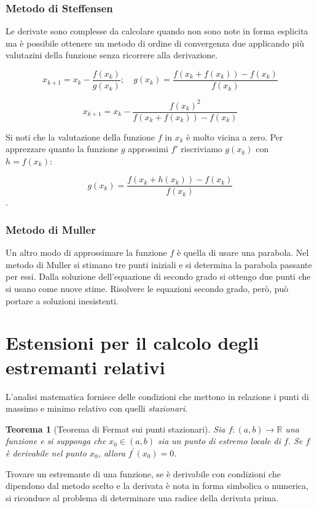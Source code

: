 \documentclass[12pt]{article}
\theoremstyle{plain}%
\newtheorem{thm}{Teorema}[section]
\theoremstyle{definition}
\theoremstyle{remark}
\begin{document}
\subsubsection{Metodo di Steffensen}

Le derivate sono complesse da calcolare quando non sono
note in forma esplicita ma è possibile ottenere un metodo
di ordine di convergenza due applicando più valutazini della funzione
senza ricorrere alla derivazione.

$$x_{k+1} = x_k -\frac{f(x_k)}{g(x_k)};\quad g(x_k) =\frac{f(x_k + f(x_k )) - f(x_k )}{f(x_k)}$$

$$x_{k+1} = x_k - \frac{f(x_k)^2}{f(x_k + f(x_k )) - f(x_k )}$$

Si noti che la valutazione della funzione $f$ in $x_k$ è molto vicina a zero.
Per apprezzare quanto la funzione $g$ approssimi $f'$ riscriviamo $g(x_k)$ con
$h = f(x_k)$:

$$g(x_k) =\frac{f(x_k + h(x_k )) - f(x_k )}{f(x_k)}$$.

\subsubsection{Metodo di Muller}

Un altro modo di approssimare la funzione $f$ è quella di usare una parabola.
Nel metodo di Muller si stimano tre punti iniziali e si determina la parabola
passante per essi. Dalla soluzione dell'equazione di secondo grado si ottengo
due punti che si usano come nuove stime.
Risolvere le equazioni secondo grado, però, può portare a soluzioni inesistenti.

\section{Estensioni per il calcolo degli estremanti relativi}

L'analisi matematica fornisce delle condizioni che mettono in relazione i punti
di massimo e minimo relativo con quelli \textit{stazionari}.

\begin{thm}[Teorema di Fermat sui punti stazionari]
Sia $f :(a, b) \to \mathbb{R}$ una funzione e si supponga che $x_0 \in  (a, b)$
sia un punto di estremo locale di $f$. Se $f$ è derivabile nel punto $x_0$,
allora $f^{\prime}(x_0) = 0$.
\end{thm}

Trovare un estremante di una funzione, se è derivabile con condizioni che
dipendono dal metodo scelto e la derivata è nota in forma simbolica o numerica,
si riconduce al problema di determinare una radice della derivata prima.
\end{document}
